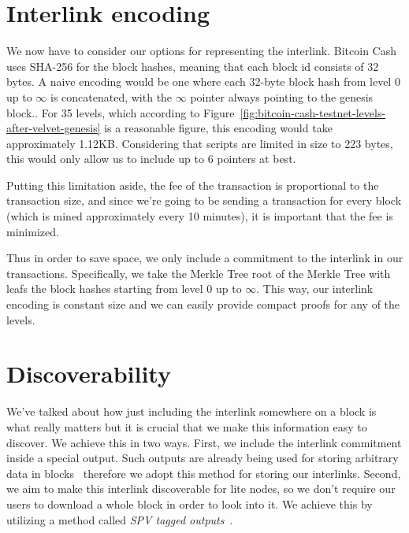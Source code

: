 \section{Interlink encoding}
We now have to consider our options for representing the interlink. 
Bitcoin Cash uses SHA-256 for the block hashes, meaning that each block id consists of 32 bytes. 
A naive encoding would be one where each 32-byte block hash from level $0$ up to $\infty$ is concatenated, with the $\infty$ pointer always pointing to the genesis block..
For 35 levels, which according to Figure~\ref{fig:bitcoin-cash-testnet-levels-after-velvet-genesis} is a reasonable figure, this encoding would take approximately 1.12KB.
Considering that  scripts are limited in size to 223 bytes, this would only allow us to include up to 6 pointers at best.


Putting this limitation aside, the fee of the transaction is proportional to the transaction size, and since we're going to be sending a transaction for every block (which is mined approximately every 10 minutes), it is important that the fee is minimized.

Thus in order to save space, we only include a commitment to the interlink in our transactions. Specifically, we take the Merkle Tree root of the Merkle Tree with leafs the block hashes starting from level $0$ up to $\infty$. This way, our interlink encoding is constant size and we can easily provide compact proofs for any of the levels.

\section{Discoverability}
We've talked about how just including the interlink somewhere on a block is what really matters but it is crucial that we make this information easy to discover. We achieve this in two ways. First, we include the interlink commitment inside a special  output. Such outputs are already being used for storing arbitrary data in blocks~\cite{arbitrary-data} therefore we adopt this method for storing our interlinks. Second, we aim to make this interlink discoverable for lite nodes, so we don't require our users to download a whole block in order to look into it. We achieve this by utilizing a method called \emph{SPV tagged outputs}~\cite{spv-tagged}.

